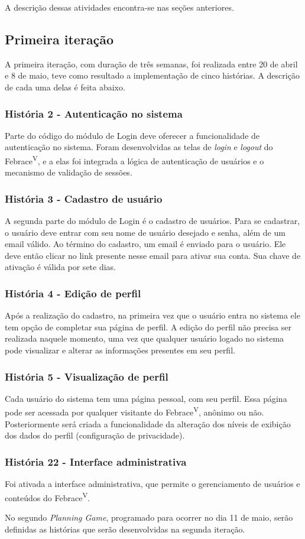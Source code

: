     A descrição dessas atividades encontra-se nas seções anteriores.

  \subsection{Primeira iteração}
    A primeira iteração, com duração de três semanas, foi realizada entre 20 de abril e 8 de maio, teve como resultado a implementação de cinco histórias. A descrição de cada uma delas é feita abaixo.

    \subsubsection{História 2 - Autenticação no sistema}
      Parte do código do módulo de Login deve oferecer a funcionalidade de autenticação no sistema. Foram desenvolvidas as telas de \textit{login} e \textit{logout} do Febrace\textsuperscript{V}, e a elas foi integrada a lógica de autenticação de usuários e o mecanismo de validação de sessões.

    \subsubsection{História 3 - Cadastro de usuário}
      A segunda parte do módulo de Login é o cadastro de usuários. Para se cadastrar, o usuário deve entrar com seu nome de usuário desejado e senha, além de um email válido. Ao término do cadastro, um email é enviado para o usuário. Ele deve então clicar no link presente nesse email para ativar sua conta. Sua chave de ativação é válida por sete dias.

    \subsubsection{História 4 - Edição de perfil}
      Após a realização do cadastro, na primeira vez que o usuário entra no sistema ele tem opção de completar sua página de perfil. A edição do perfil não precisa ser realizada naquele momento, uma vez que qualquer usuário logado no sistema pode visualizar e alterar as informações presentes em seu perfil.

    \subsubsection{História 5 - Visualização de perfil}
      Cada usuário do sistema tem uma página pessoal, com seu perfil. Essa página pode ser acessada por qualquer visitante do Febrace\textsuperscript{V}, anônimo ou não. Posteriormente será criada a funcionalidade da alteração dos níveis de exibição dos dados do perfil (configuração de privacidade).

    \subsubsection{História 22 - Interface administrativa}
      Foi ativada a interface administrativa, que permite o gerenciamento de usuários e conteúdos do Febrace\textsuperscript{V}.

    No segundo \textit{Planning Game}, programado para ocorrer no dia 11 de maio, serão definidas as histórias que serão desenvolvidas na segunda iteração.

